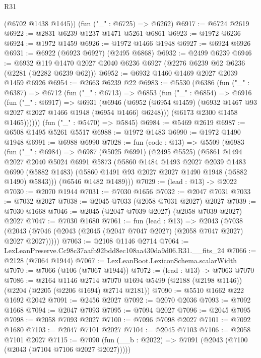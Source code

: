 \begin{lexlean}{R31}
\begin{coremodule}
      (@6702 @1438 @1445))
    (fun ("_" : @6725) => @6262)
@6917 := @6724 @2619
@6922 := @2831 @6239 @1237 @1471 @5261 @6861
@6923 := @1972 @6236
@6924 := @1972 @1459
@6926 := @1972 @1466 @1948
@6927 := @6924 @6926
@6931 := @6922 (@6923 @6927) (@2495 @6868)
@6932 := @2499 @6239
@6946 := @6932 @119 @1470 @2027 @2040 @6236 @6927 (@2276 @6239 @62 @6236 (@2281 (@2282 @6239 @62)))
@6952 := @6932 @1460 @1469 @2027 @2039 @1459 @6926
@6954 := @2663 @6239 @22
@6983 := @5530
    (@6386
      (fun ("_" : @6387) =>
      @6712
        (fun ("_" : @6713) =>
        @6853
          (fun ("_" : @6854) =>
          @6916
            (fun ("_" : @6917) =>
            @6931
              (@6946
                (@6952 (@6954 @1459) (@6932 @1467 @93 @2027 @2027 @1466 @1948 (@6954 @1466) @6248)))
              (@6173 @2300 @1458 @1465))))))
    (fun ("_" : @5470) => @5845)
@6984 := @5469 @2619
@6987 := @6508 @1495 @5261 @5517
@6988 := @1972 @1483
@6990 := @1972 @1490 @1948
@6991 := @6988 @6990
@7028 := fun (code : @13) =>
  @5509
    (@6983
      (fun ("_" : @6984) =>
      @6987
        (@5025 @6991)
        (@2495 @5525)
        (@5861
          @1494
          @2027
          @2040
          @5024
          @6991
          @5873
          (@5860
            @1484
            @1493
            @2027
            @2039
            @1483
            @6990
            (@5882 @1483)
            (@5860 @1491 @93 @2027 @2027 @1490 @1948 (@5882 @1490) @5843)))
        (@6546 @1482 @1489)))
@7029 := (lead : @13) -> @2022
@7030 := @2070 @1944
@7031 := @7030 @1656
@7032 := @2047 @7031
@7033 := @7032 @2027
@7038 := @2045 @7033 (@2058 @7031 @2027) @2027
@7039 := @7030 @1668
@7046 := @2045 (@2047 @7039 @2027) (@2058 @7039 @2027) @2027
@7047 := @7030 @1680
@7061 := fun (lead : @13) =>
  @2043 (@7038 (@2043 (@7046 (@2043 (@2045 (@2047 @7047 @2027) (@2058 @7047 @2027) @2027 @2027)))))
@7063 := @2108 @1146 @2714
@7064 := LexLeanPreserve.Cc98c37aafb92bdd8ec108aa430da9d06.R31.__fits_24
@7066 := @2128 (@7064 @1944)
@7067 := LexLeanBoot.LexiconSchema.scalarWidth
@7070 := @7066 (@106 (@7067 @1944))
@7072 := (lead : @13) -> @7063 @7070
@7086 := @2164
    @1146
    @2714
    @7070
    @1694
    @5499
    (@2188 (@2198 @1146))
    (@2204 (@2205 (@2206 @1694) @2714 @2181))
@7090 := @5510 @1662 @222 @1692 @2042
@7091 := @2456 @2027
@7092 := @2070 @2036
@7093 := @7092 @1668
@7094 := @2047 @7093
@7095 := @7094 @2027
@7096 := @2045 @7095
@7098 := @2058 @7093 @2027
@7100 := @7096 @7098 @2027
@7101 := @7092 @1680
@7103 := @2047 @7101 @2027
@7104 := @2045 @7103
@7106 := @2058 @7101 @2027
@7115 := @7090 (fun (__b : @2022) => @7091 (@2043 (@7100 (@2043 (@7104 @7106 @2027 @2027)))))

\end{coremodule}
\end{lexlean}
